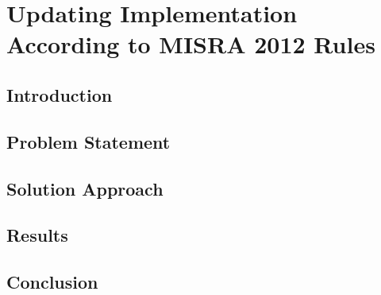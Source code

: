 \chapter{Updating Implementation According to MISRA 2012 Rules}

\section{Introduction}
\lipsum[1-2] %

\section{Problem Statement}
\lipsum[3] %

\section{Solution Approach}
\lipsum[4] %

\section{Results}
\lipsum[5] %

\section{Conclusion}
\lipsum[6] %
